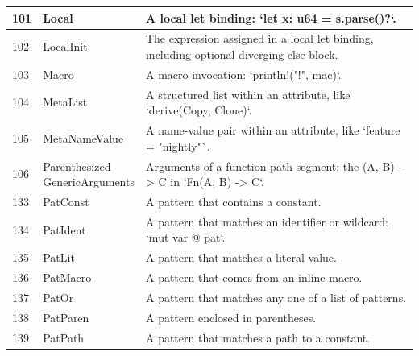 \begin{longtable}{| p{} | p{} | p{} |}
101   & Local                          & A local let binding: `let x: u64 = s.parse()?`.                                                                \\ \hline
102   & LocalInit                      & The expression assigned in a local let binding, including optional diverging else block.                       \\ \hline
103   & Macro                          & A macro invocation: `println!("{}!", mac)`.                                                                    \\ \hline
104   & MetaList                       & A structured list within an attribute, like `derive(Copy, Clone)`.                                             \\ \hline
105   & MetaNameValue                  & A name-value pair within an attribute, like `feature = "nightly"`.                                             \\ \hline
106   & \makecell{Parenthesized \\ GenericArguments}  & Arguments of a function path segment: the (A, B) -> C in `Fn(A, B) -> C`.                                      \\ \hline
133   & PatConst                       & A pattern that contains a constant.                                                                            \\ \hline
134   & PatIdent                       & A pattern that matches an identifier or wildcard: `mut var @ pat`.                                             \\ \hline
135   & PatLit                         & A pattern that matches a literal value.                                                                        \\ \hline
136   & PatMacro                       & A pattern that comes from an inline macro.                                                                     \\ \hline
137   & PatOr                          & A pattern that matches any one of a list of patterns.                                                          \\ \hline
138   & PatParen                       & A pattern enclosed in parentheses.                                                                             \\ \hline
139   & PatPath                        & A pattern that matches a path to a constant.                                                                   \\ \hline

\end{longtable}
